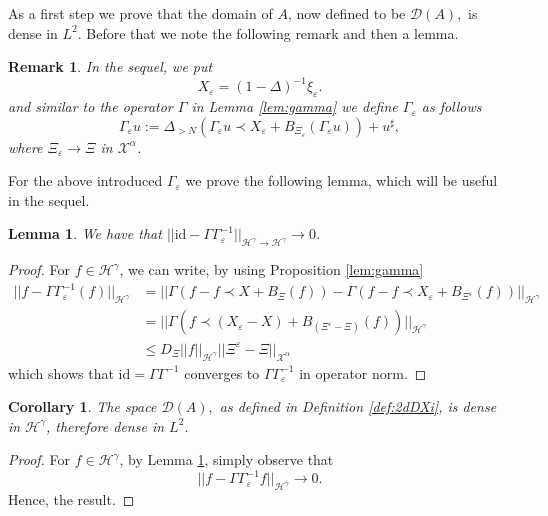 \documentclass[11pt, oneside]{article}   	%
\newtheorem{corollary}[theorem]{Corollary}
\newtheorem{lemma}[theorem]{Lemma}
\newtheorem{remark}[theorem]{Remark}
\begin{document}
As a first step we prove that the domain of $A$, now defined to be $\mathscr{D}(A),$ is dense in $L^2.$  Before that we note the following remark and then a lemma.

\begin{remark}\upshape\label{rem:smoothNotation}
In the sequel, we put
\[
 X_\varepsilon = (1 - \Delta)^{- 1} \xi_\varepsilon.
\]
and similar to the operator $\Gamma$ in Lemma \ref{lem:gamma} we define  $\Gamma_\varepsilon$ as follows
\[ \Gamma_\varepsilon u := \Delta_{> N} (\Gamma_\varepsilon u \prec X_\varepsilon + B_{\Xi_\varepsilon} (\Gamma_\varepsilon u)) + u^\sharp, \]
where $\Xi_\varepsilon \rightarrow  \Xi$ in $\mathscr{X}^\alpha$. 
\end{remark}

For the above introduced $\Gamma_\varepsilon$ we prove the following lemma, which will be useful in the sequel.

\begin{lemma} \label{lem:identityGammaconv}
	We have that $|| \text{id} - \Gamma  \Gamma_\varepsilon^{-1}||_{\mathscr{H}^\gamma \rightarrow \mathscr{H}^\gamma} \rightarrow 0$.
\end{lemma}

\begin{proof}
	For $f \in \mathscr{H}^\gamma$, we can write, by using Proposition \ref{lem:gamma}
	\begin{align*}
	|| f -  \Gamma \Gamma_\varepsilon^{-1}(f)||_{ \mathscr{H}^\gamma} &= || \Gamma(f - f\prec X + B_{\Xi} (f))  -   \Gamma(f - f\prec X_\varepsilon + B_{\Xi^\varepsilon} (f)) ||_{ \mathscr{H}^\gamma}\\
	&= || \Gamma(f\prec ( X_\varepsilon - X) + B_{(\Xi^\varepsilon - \Xi)} (f))||_{ \mathscr{H}^\gamma}\\
	& \leq D_\Xi ||f||_{\mathscr{H}^\gamma} || \Xi^\varepsilon - \Xi||_{ \mathscr{X^\alpha}}
	\end{align*}
	which shows that $\text{id} = \Gamma  \Gamma^{-1}$ converges to $\Gamma  \Gamma_\varepsilon^{-1}$ in operator norm.
\end{proof}


\begin{corollary}
	The space $\mathscr{D}(A),$ as defined in Definition \ref{def:2dDXi},  is dense in $\mathscr{H}^\gamma$, therefore dense  in $L^2$.
\end{corollary}  
\begin{proof}
For $f \in \mathscr{H}^\gamma$, by Lemma \ref{lem:identityGammaconv}, simply observe that
\[
|| f -   \Gamma \Gamma_\varepsilon^{-1} f||_{\mathscr{H}^\gamma} \rightarrow 0.
\]
Hence, the result.
\end{proof}
\end{document}
